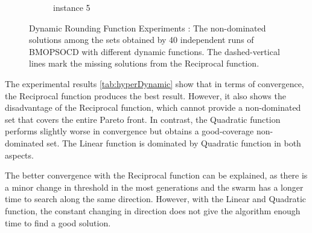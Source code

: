 \documentclass[10pt,journal,compsoc]{IEEEtran}
\begin{document}
\begin{figure}[h!]
\begin{subfigure}{0.49\linewidth}
    \caption{instance 5}
   \end{subfigure}
   \caption{Dynamic Rounding Function Experiments : The non-dominated solutions among the sets obtained by 40 independent runs of BMOPSOCD with different dynamic functions. The dashed-vertical lines mark the missing solutions from the Reciprocal function.}
   \label{fig:dynamicFunctions}
\end{figure}


\begin{table}[H]
\centering
\footnotesize
{}
\caption{The mean and standard deviation of the HyperVolume values over the 40 independent runs}
\label{tab:hyperDynamic}

\end{table}

The experimental results \ref{tab:hyperDynamic} show that in terms of convergence, the Reciprocal function produces the best result. 
However, it also shows the disadvantage of the Reciprocal function, which cannot provide a non-dominated set that covers the entire Pareto front. 
In contrast, the Quadratic function performs
slightly worse in convergence but obtains a good-coverage non-dominated set. The Linear function is dominated by Quadratic function in both aspects.

The better convergence with the Reciprocal function can be explained, as there is a minor change in threshold in the most generations and the swarm has a longer time to search along the same direction. However, with the Linear and Quadratic function, the constant changing in direction does not give the algorithm enough time to find a good solution.
\end{document}
